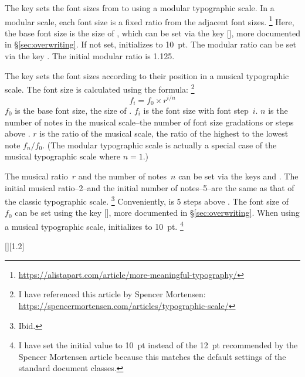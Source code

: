 \documentclass{beery}
\begin{document}


The key  sets the font sizes from  to  using a modular typographic scale.
In a modular scale, each font size is a fixed ratio from the adjacent font sizes.%
\footnote{\url{https://alistapart.com/article/more-meaningful-typography/}}
Here, the base font size is the size of , which can be set via the key [], more documented in \S\ref{sec:overwriting}.
If not set,  initializes to \qty{10}{pt}.
The modular ratio can be set via the key .
The initial modular ratio is \num{1.125}.



The key  sets the font sizes according to their position in a musical typographic scale.
The font size is calculated using the formula:%
\footnote
  {%
    I have referenced this article by Spencer Mortensen:
    \newline
    \url{https://spencermortensen.com/articles/typographic-scale/}%
  }
\[ f_i = f_0 \times r ^ { i / n } \]
$f_0$ is the base font size, the size of .
$f_i$ is the font size with font step~$i$.
$n$ is the number of notes in the musical scale\---the number of font size gradations or steps above .
$r$ is the ratio of the musical scale, the ratio of the highest to the lowest note $ f_n / f_0 $.
(The modular typographic scale is actually a special case of the musical typographic scale where $n=1$.)

The musical ratio~$r$ and the number of notes~$n$ can be set via the keys  and .
The initial musical ratio\---\num{2}\---and the initial number of notes\---\num{5}\---are the same as that of the classic typographic scale.%
\footnote{Ibid.}
Conveniently,  is \num{5} steps above .
The font size of ~$f_0$ can be set using the key [], more documented in \S\ref{sec:overwriting}.
When using a musical typographic scale,  initializes to \qty{10}{pt}.%
\footnote {I have set the initial value to \qty{10}{pt} instead of the \qty{12}{pt} recommended by the Spencer Mortensen article because this matches the default settings of the standard \LaTeXe{} document classes.}

[][1.2]
\KeepNextPar*
\end{document}
